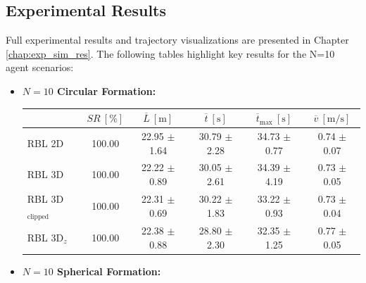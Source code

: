     \subsection{Experimental Results}
        Full experimental results and trajectory visualizations are presented in Chapter \ref{chap:exp_sim_res}. 
        The following tables highlight key results for the N=10 agent scenarios:
        \begin{itemize}
            \item \textbf{$N = 10$ Circular Formation:}
                \begin{table}[H]
                    \centering
                    \renewcommand{\arraystretch}{1.2}
                    \begin{tabular}{|l|c|c|c|c|c|}
                    \hline
                                                & \( SR \ [\%] \) & \( \overline{L} \ [\mathrm{m}] \) & \( \overline{t} \ [\mathrm{s}] \) & \( \overline{t}_{\text{max}} \ [\mathrm{s}] \) & \( \overline{v} \ [\mathrm{m/s}] \)     \\ \hline
                    RBL \ac{2D}                      & 100.00          & 22.95 $\pm$ 1.64                  & 30.79 $\pm$ 2.28                  & 34.73 $\pm$ 0.77                               & 0.74 $\pm$ 0.07                         \\ \hline
                    RBL \ac{3D}                      & 100.00          & 22.22 $\pm$ 0.89                  & 30.05 $\pm$ 2.61                  & 34.39 $\pm$ 4.19                               & 0.73 $\pm$ 0.05                         \\ \hline
                    RBL \ac{3D}\(_{\text{clipped}}\) & 100.00          & 22.31 $\pm$ 0.69                  & 30.22 $\pm$ 1.83                  & 33.22 $\pm$ 0.93                               & 0.73 $\pm$ 0.04                         \\ \hline
                    RBL \ac{3D}\(_z\)                & 100.00          & 22.38 $\pm$ 0.88                  & 28.80 $\pm$ 2.30                  & 32.35 $\pm$ 1.25                               & 0.77 $\pm$ 0.05                         \\ \hline
                    \end{tabular}
                \end{table}
            \item \textbf{$N = 10$ Spherical Formation:}
                \begin{table}[H]
                    \centering
                    \renewcommand{\arraystretch}{1.2}

\end{table}
\end{itemize}
